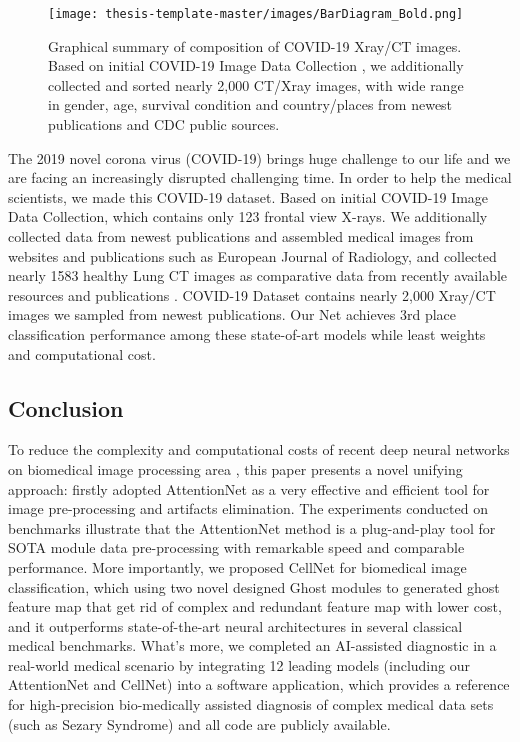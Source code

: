 \begin{figure}[h]
\texttt{[image: thesis-template-master/images/BarDiagram\_Bold.png]}
\label{fig}
\centering
\caption{Graphical summary of composition of COVID-19 Xray/CT images. Based on initial COVID-19 Image Data Collection \cite{b37}, we additionally collected and sorted nearly 2,000 CT/Xray images, with wide range in gender, age, survival condition and country/places from newest publications and CDC public sources\cite{b36}\cite{b37}\cite{b38}. }
\end{figure}
The 2019 novel corona virus (COVID-19) brings huge challenge to our life and we are facing an increasingly disrupted challenging time. In order to help the medical scientists, we made this COVID-19 dataset. Based on initial COVID-19 Image Data Collection\cite{b37}, which contains only 123 frontal view X-rays. We additionally collected data from newest publications and  assembled medical images from websites and publications such as European Journal of Radiology\cite{b36}, and collected nearly 1583 healthy Lung CT images as comparative data from recently available resources and publications\cite{b37} \cite{b38}. COVID-19 Dataset contains nearly 2,000 Xray/CT images we sampled from newest publications. Our Net achieves 3rd place classification performance among these state-of-art models while least weights and computational cost.




\subsection*{Conclusion}
To reduce the complexity and computational costs of recent deep neural networks on biomedical image processing area \cite{b3}\cite{b15}\cite{b17}, this paper presents a novel unifying approach: firstly adopted AttentionNet as a very effective and efficient tool for image pre-processing and artifacts elimination. The experiments conducted on benchmarks illustrate that the AttentionNet method is a plug-and-play tool for SOTA module data pre-processing with remarkable speed and comparable performance. More importantly, we proposed CellNet for biomedical image classification, which using two novel designed Ghost modules to generated ghost feature map that get rid of complex and redundant feature map with lower cost, and it outperforms state-of-the-art neural architectures in several classical medical benchmarks.
What's more, we completed an AI-assisted diagnostic in a real-world medical scenario by integrating 12 leading models (including our AttentionNet and CellNet) into a software application, which provides a reference for high-precision bio-medically assisted diagnosis of complex medical data sets (such as Sezary Syndrome) and all code are publicly available.




